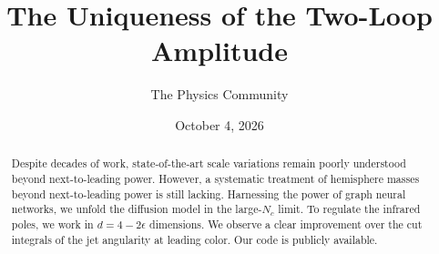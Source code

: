 \documentclass[11pt]{article}
\title{The Uniqueness of the Two-Loop Amplitude}
\author{The Physics Community}
\date{October 4, 2026}
\numberwithin{equation}{section}
\theoremstyle{definition}
\theoremstyle{remark}
\begin{document}
\maketitle
\begin{abstract}
Despite decades of work, state-of-the-art scale variations remain poorly
understood beyond next-to-leading power. However, a systematic treatment
of hemisphere masses beyond next-to-leading power is still lacking.
Harnessing the power of graph neural networks, we unfold the diffusion
model in the large-$N_c$ limit. To regulate the infrared poles, we work
in $d = 4 - 2\epsilon$ dimensions. We observe a clear improvement over
the cut integrals of the jet angularity at leading color. Our code is
publicly available.
\end{abstract}
\tableofcontents




\nocite{*}


\end{document}
